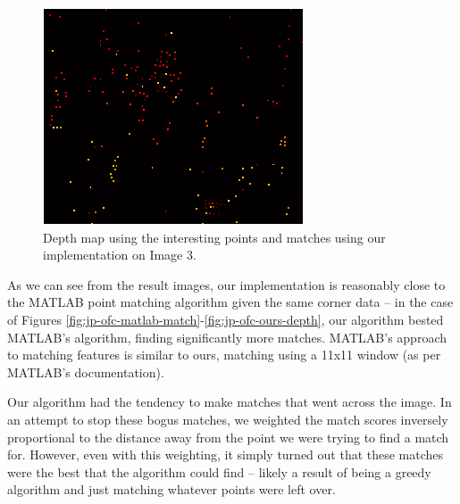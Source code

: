 \begin{figure}[H]\centering
	\includegraphics[width=0.8\linewidth]{Images/03_our_depth.png}
	\caption{Depth map using the interesting points and matches using our implementation on Image 3.}
	\label{fig:grid-example}
\end{figure}

As we can see from the result images, our implementation is reasonably close to the MATLAB point matching algorithm given the same corner data -- in the case of Figures \ref{fig:jp-ofc-matlab-match}-\ref{fig:jp-ofc-ours-depth}, our algorithm bested MATLAB's algorithm, finding significantly more matches. MATLAB's approach to matching features is similar to ours, matching using a 11x11 window (as per MATLAB's documentation). 

Our algorithm had the tendency to make matches that went across the image. In an attempt to stop these bogus matches, we weighted the match scores inversely proportional to the distance away from the point we were trying to find a match for. However, even with this weighting, it simply turned out that these matches were the best that the algorithm could find -- likely a result of being a greedy algorithm and just matching whatever points were left over. 